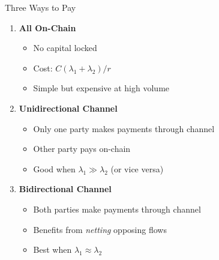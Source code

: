 \documentclass[aspectratio=169,12pt]{beamer}
\begin{document}
\begin{frame}{Three Ways to Pay}
\begin{enumerate}
    \item \textbf{All On-Chain}
    \begin{itemize}
        \item No capital locked
        \item Cost: $C(\lambda_1 + \lambda_2)/r$
        \item Simple but expensive at high volume
    \end{itemize}
    
    \vspace{0.3cm}
    \item \textbf{Unidirectional Channel}
    \begin{itemize}
        \item Only one party makes payments through channel
        \item Other party pays on-chain
        \item Good when $\lambda_1 \gg \lambda_2$ (or vice versa)
    \end{itemize}
    
    \vspace{0.3cm}
    \item \textbf{Bidirectional Channel}
    \begin{itemize}
        \item Both parties make payments through channel
        \item Benefits from \textit{netting} opposing flows
        \item Best when $\lambda_1 \approx \lambda_2$
    \end{itemize}
\end{enumerate}
\end{frame}
\end{document}
